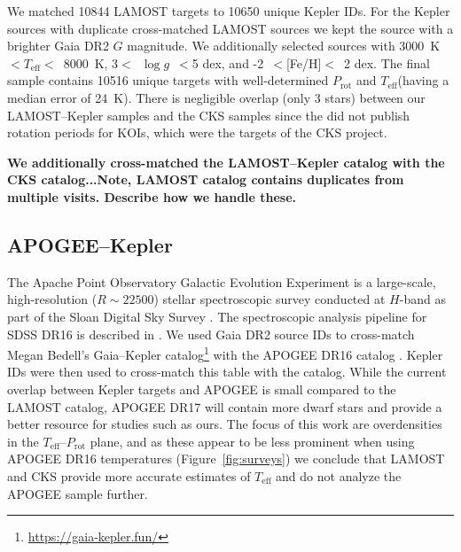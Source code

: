 \documentclass[twocolumn]{aastex631}
\newcommand{\teff}{\ensuremath{T_{\mathrm{eff}}}\xspace}
\newcommand{\logg}{\ensuremath{\log g}\xspace}
\newcommand{\prot}{\ensuremath{P_\mathrm{rot}}\xspace}
\begin{document}
We matched 10844 LAMOST targets to 10650 unique Kepler IDs. For the Kepler sources with duplicate cross-matched LAMOST sources we kept the source with a brighter Gaia DR2 $G$ magnitude. We additionally selected sources with 3000~K$< \teff <$~8000~K, 3$<$~\logg~$<$5 dex, and -2~$<$[Fe/H]$<$~2 dex. The final sample contains 10516 unique targets with well-determined \prot and \teff (having a median error of 24~K). There is negligible overlap (only 3 stars) between our LAMOST--Kepler samples and the CKS samples since the \citet{McQuillan2014} did not publish rotation periods for KOIs, which were the targets of the CKS project. 


\textbf{We additionally cross-matched the LAMOST--Kepler catalog with the CKS catalog...Note, LAMOST catalog contains duplicates from multiple visits. Describe how we handle these.}

\subsection{APOGEE--Kepler}
The Apache Point Observatory Galactic Evolution Experiment \citep[APOGEE,][]{Majewski2017} is a large-scale, high-resolution ($R \sim 22500$) stellar spectroscopic survey conducted at $H$-band as part of the Sloan Digital Sky Survey \citep[SDSS-IV][]{Blanton2017}. The spectroscopic analysis pipeline for SDSS DR16 is described in \citet{Jonsson2020}. We used Gaia DR2 source IDs \citep{Gaia2016, Gaia2018} to cross-match Megan Bedell's Gaia--Kepler catalog\footnote{\url{https://gaia-kepler.fun/}} with the APOGEE DR16 catalog \citep{Ahumada2020}. Kepler IDs were then used to cross-match this table with the \citet{McQuillan2014} catalog. While the current overlap between Kepler targets and APOGEE is small compared to the LAMOST catalog, APOGEE DR17 will contain more dwarf stars and provide a better resource for studies such as ours. The focus of this work are overdensities in the \teff--\prot plane, and as these appear to be less prominent when using  APOGEE DR16 temperatures (Figure~\ref{fig:surveys}) we conclude that LAMOST and CKS provide more accurate estimates of \teff and do not analyze the APOGEE sample further. 
\end{document}

